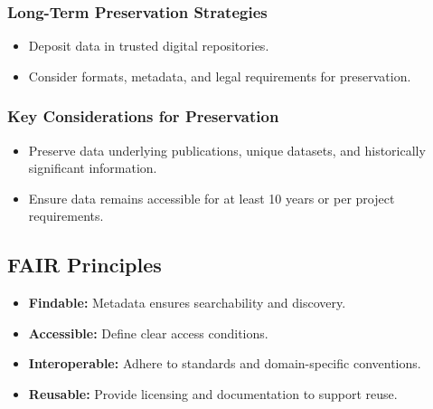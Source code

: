 \subsubsection{Long-Term Preservation Strategies}
\begin{itemize}
    \item Deposit data in trusted digital repositories.
    \item Consider formats, metadata, and legal requirements for preservation.
\end{itemize}

\subsubsection{Key Considerations for Preservation}
\begin{itemize}
    \item Preserve data underlying publications, unique datasets, and historically significant information.
    \item Ensure data remains accessible for at least 10 years or per project requirements.
\end{itemize}

\subsection{FAIR Principles}
\begin{itemize}
    \item \textbf{Findable:} Metadata ensures searchability and discovery.
    \item \textbf{Accessible:} Define clear access conditions.
    \item \textbf{Interoperable:} Adhere to standards and domain-specific conventions.
    \item \textbf{Reusable:} Provide licensing and documentation to support reuse.
\end{itemize}
